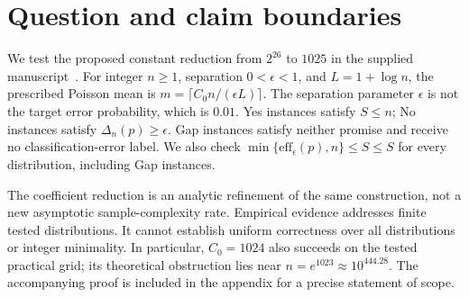 \begin{abstract}

We evaluate the explicit coefficient $C_0=1025$ for Wang\textquotesingle s support-size tester, conditional on the accompanying proof and with $L_0=1024$ unchanged. The frozen main design comprises 9,130,000 independent simulated Poisson-process paths and 39,720,000 paired method evaluations. Synthetic sizes range from $1$ to $10^{12}$ across five separation parameters and up to fifteen distribution scenarios. Ten published empirical populations cover trees, mites, birds, spiders, moths, snails, and fish. No errors are observed for $C_0=1025$ in the promised primary cells; worst simultaneous 95\% error upper bounds are 0.107\% on synthetic and 0.095\% on empirical populations. However, all practical sizes use the observed-count branch, a simple certified count baseline requires fewer samples, and only 2 of 236 ecological configurations have as many original records as the prescribed mean. Correlation stress tests expose violations of the iid requirement. Full-degree interval checks and public-API executions support implementation fidelity without substituting for a universal proof or a field validation.

\end{abstract}

\section{Question and claim boundaries}

We test the proposed constant reduction from $2^{26}$ to $1025$ in the supplied manuscript~\cite{wang}. For integer $n\ge1$, separation $0<\epsilon<1$, and $L=1+\log n$, the prescribed Poisson mean is $m=\lceil C_0n/(\epsilon L)\rceil$. The separation parameter $\epsilon$ is not the target error probability, which is $0.01$. Yes instances satisfy $S\le n$; No instances satisfy $\Delta_n(p)\ge\epsilon$. Gap instances satisfy neither promise and receive no classification-error label. We also check $\min\{\mathrm{eff}_\epsilon(p),n\}\le\widehat S\le S$ for every distribution, including Gap instances.

The coefficient reduction is an analytic refinement of the same construction, not a new asymptotic sample-complexity rate. Empirical evidence addresses finite tested distributions. It cannot establish uniform correctness over all distributions or integer minimality. In particular, $C_0=1024$ also succeeds on the tested practical grid; its theoretical obstruction lies near $n=e^{1023}\approx10^{444.28}$. The accompanying proof is included in the appendix for a precise statement of scope.

